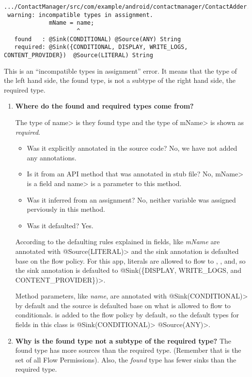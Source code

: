 \begin{Verbatim}  
.../ContactManager/src/com/example/android/contactmanager/ContactAdder.java:309:
 warning: incompatible types in assignment.
             mName = name;
                     ^
   found   : @Sink(CONDITIONAL) @Source(ANY) String
   required: @Sink({CONDITIONAL, DISPLAY, WRITE_LOGS, CONTENT_PROVIDER})  @Source(LITERAL) String
\end{Verbatim}
This is an ``incompatible types in assignment'' error.  It means that the type
of the left hand side, the found type, is not a subtype of the right hand side,
the required type.
 
\begin{enumerate}

\item \textbf{Where do the found  and required types come from?}

The type of \<name> is they found type and the type of \<mName> is
shown as \emph{required}.  

 \begin{itemize}
    \item Was it explicitly annotated in the source code? No, we have not added 
    any annotations.
    \item Is it from an API method that was annotated in stub file? No, \<mName> 
    is a field and \<name> is a parameter to this method.
    \item Was it inferred from an assignment? No, neither variable was assigned 
    perviously in this method. 
    \item Was it defaulted? Yes.
    \end{itemize}

 According to the defaulting rules explained in  fields, like \emph{mName} 
 are annotated with \<@Source(LITERAL)> and the sink annotation is defaulted base on the  
 flow policy.  For this app, literals are allowed to flow to , 
 , and, so the sink annotation is 
 defaulted to \<@Sink(\{DISPLAY, WRITE\_LOGS, and CONTENT\_PROVIDER\})>.
 
 Method parameters, like \emph{name}, are annotated with \<@Sink(CONDITIONAL)> by 
 default and the source is defaulted base on what is allowed to flow to conditionals.
    is added to the flow policy by default, so the default types
    for fields in this class is \<@Sink(CONDITIONAL)> \<@Source(ANY)>.

 
 \item\textbf{ Why is the found type not a subtype of the required type?}
The found type has more sources than the required type. (Remember that 
is the set of all Flow Permissions). Also, the \emph{found} type has fewer sinks 
than the required type.


\end{enumerate}
